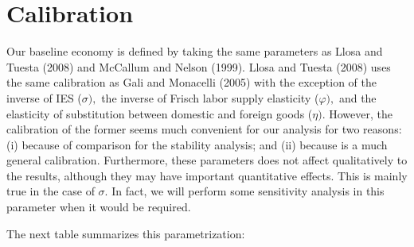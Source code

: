 \documentclass[11pt]{article}
\begin{document}
\section{Calibration}

Our baseline economy is defined by taking the same parameters as Llosa and
Tuesta (2008) and McCallum and Nelson (1999). Llosa and Tuesta (2008) uses
the same calibration as Gali and Monacelli (2005) with the exception of the
inverse of IES ($\sigma ),$ the inverse of Frisch labor supply elasticity ($%
\varphi ),$ and the elasticity of substitution between domestic and foreign
goods ($\eta ).$ However, the calibration of the former seems much
convenient for our analysis for two reasons: (i) because of comparison for
the stability analysis; and (ii) because is a much general calibration.
Furthermore, these parameters does not affect qualitatively to the results,
although they may have important quantitative effects. This is mainly true
in the case of $\sigma .$ In fact, we will perform some sensitivity analysis
in this parameter when it would be required.

The next table summarizes this parametrization:
\end{document}

